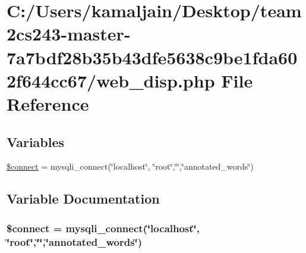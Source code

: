 \hypertarget{web__disp_8php}{}\section{C\+:/\+Users/kamaljain/\+Desktop/team2cs243-\/master-\/7a7bdf28b35b43dfe5638c9be1fda602f644cc67/web\+\_\+disp.php File Reference}
\label{web__disp_8php}
\subsection*{Variables}
\begin{DoxyCompactItemize}
\item 
\hyperlink{web__disp_8php_a956617395b85e98d907df712f6d0d3f7}{\$connect} = mysqli\+\_\+connect(\char`\"{}localhost\char`\"{}, \char`\"{}root\char`\"{},\char`\"{}\char`\"{},\char`\"{}annotated\+\_\+words\char`\"{})
\end{DoxyCompactItemize}


\subsection{Variable Documentation}
\subsubsection[{\texorpdfstring{\$connect}{$connect}}]{\setlength{\rightskip}{0pt plus 5cm}\$connect = mysqli\+\_\+connect(\char`\"{}localhost\char`\"{}, \char`\"{}root\char`\"{},\char`\"{}\char`\"{},\char`\"{}annotated\+\_\+words\char`\"{})}\hypertarget{web__disp_8php_a956617395b85e98d907df712f6d0d3f7}{}\label{web__disp_8php_a956617395b85e98d907df712f6d0d3f7}

